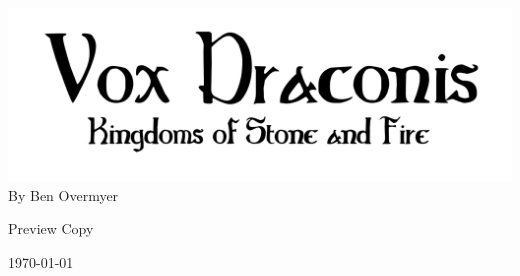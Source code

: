 \documentclass[letterpaper,table]{voxdraconis}
\begin{document}
\frontmatter
\thispagestyle{empty}

\begin{center}
\includegraphics[center]{logo-vox-draconis-2}
By Ben Overmyer

Preview Copy

\today
\end{center}

\setcounter{tocdepth}{2}
\tableofcontents
\newpage

\mainmatter












\printindex
\end{document}
